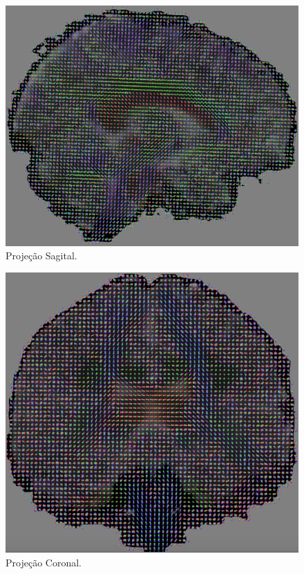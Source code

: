 \documentclass[
    12pt,                %
    oneside,            %
    a4paper,            %
    english,            %
    french,                %
    spanish,            %
    brazil                %
    ]{abntex2}
\begin{document}
\begin{figure}[H]
\label{fig::QBall_glifos_sagital}
    \centering

    \includegraphics[width=.7\linewidth, angle=0]{figs/Exemplos_QBall_visualizacao/Sagital.png}
    \caption{Projeção Sagital.}
\end{figure}

\begin{figure}[H]
\label{fig::QBall_glifos_coronal}
    \centering

    \includegraphics[width=0.7\linewidth, angle=0]{figs/Exemplos_QBall_visualizacao/Coronal.png}
    \caption{Projeção Coronal.}
\end{figure}
\end{document}
